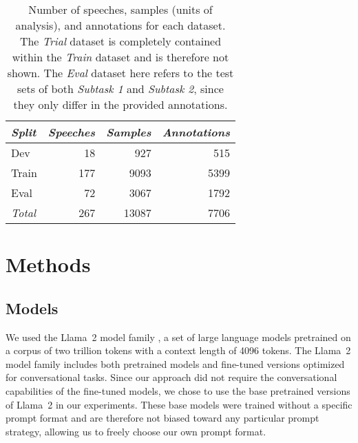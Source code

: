 \documentclass[11pt,a4paper]{article}
\begin{document}
\begin{table}
    \centering
    \begin{tabularx}{\linewidth}{Xrrr}
        \toprule
        \emph{Split} & \emph{Speeches} & \emph{Samples} & \emph{Annotations} \\
        \midrule
        Dev            & 18                & 927            & 515           \\
        Train          & 177               & 9093           & 5399          \\
        Eval           & 72                & 3067           & 1792        \\
        \midrule
        \emph{Total} & 267               & 13087          & 7706          \\
        \bottomrule
    \end{tabularx}
    \caption{
        Number of speeches, samples (units of analysis), and annotations for each dataset.
        The \emph{Trial} dataset is completely contained within the \emph{Train} dataset and is therefore not shown.
        The \emph{Eval} dataset here refers to the test sets of both \emph{Subtask 1} and \emph{Subtask 2}, since they only differ in the provided annotations.
    }
    \label{tab:data_speeches_units_per_split}
\end{table}

 

\section{Methods}
\label{sec:methods}

\subsection{Models}
\label{ssec:models}

We used the Llama~2 model family \cite{Touvron2023b}, a set of large language models pretrained on a corpus of two trillion tokens with a context length of 4096 tokens.
The Llama~2 model family includes both pretrained models and fine-tuned versions optimized for conversational tasks.
Since our approach did not require the conversational capabilities of the fine-tuned models, we chose to use the base pretrained versions of Llama~2 in our experiments.
These base models were trained without a specific prompt format and are therefore not biased toward any particular prompt strategy, allowing us to freely choose our own prompt format.
\end{document}
